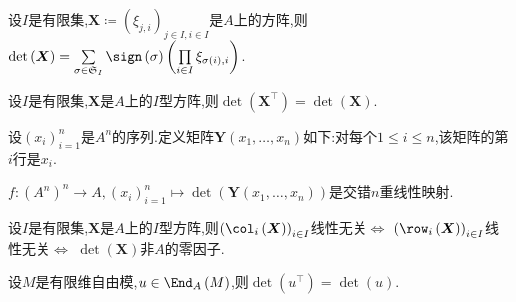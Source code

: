 \begin{proposition}{}{}
	设$I$是有限集,$\boldsymbol{X}\coloneq\left(\xi_{j,i}\right)_{j\in I,i\in I}$是$A$上的方阵,则$\det\left(\boldsymbol{X}\right)=\sum\limits_{\sigma\in\mathfrak{S}_{I}}\sign\left(\sigma\right)\left(\prod\limits_{i\in I}\xi_{\sigma\left(i\right),i}\right)$.
\end{proposition}

\begin{proposition}{}{}
	设$I$是有限集,$\boldsymbol{X}$是$A$上的$I$型方阵,则$\det\left(\boldsymbol{X}^{\top}\right)=\det\left(\boldsymbol{X}\right)$.
\end{proposition}

\begin{definition}{}{}
	设$\left(x_{i}\right)_{i=1}^{n}$是$A^{n}$的序列.定义矩阵$\boldsymbol{Y}\left(x_{1},\ldots,x_{n}\right)$如下:对每个$1\leq i\leq n$,该矩阵的第$i$行是$x_{i}$.
\end{definition}

\begin{corollary}{}{}
	$f:\left(A^{n}\right)^{n}\to A,\left(x_{i}\right)_{i=1}^{n}\mapsto\det\left(\boldsymbol{Y}\left(x_{1},\ldots,x_{n}\right)\right)$是交错$n$重线性映射.
\end{corollary}

\begin{corollary}{}{}
	设$I$是有限集,$\boldsymbol{X}$是$A$上的$I$型方阵,则$\left(\col_{i}\left(\boldsymbol{X}\right)\right)_{i\in I}$线性无关$\iff$ $\left(\row_{i}\left(\boldsymbol{X}\right)\right)_{i\in I}$线性无关$\iff$ $\det\left(\boldsymbol{X}\right)$非$A$的零因子.
\end{corollary}

\begin{corollary}{}{}
	设$M$是有限维自由模,$u\in\End_{A}\left(M\right)$,则$\det\left(u^{\top}\right)=\det\left(u\right)$.
\end{corollary}


















